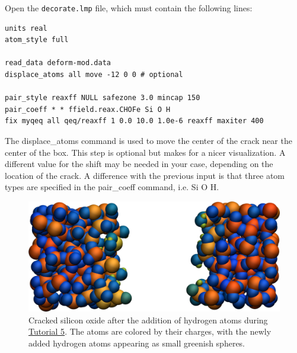 \documentclass[9pt,tutorial]{livecoms}
\newcommand{\lmpcmd}[1]{\colorbox{listing}{\textcolor{command}{\small{#1}}}} %
\newcommand{\flecmd}[1]{\textcolor{command}{\texttt{#1}}} %
\begin{document}
Open the \flecmd{decorate.lmp} file, which must contain the following lines:
\begin{lstlisting}
units real
atom_style full

read_data deform-mod.data
displace_atoms all move -12 0 0 # optional

pair_style reaxff NULL safezone 3.0 mincap 150
pair_coeff * * ffield.reax.CHOFe Si O H
fix myqeq all qeq/reaxff 1 0.0 10.0 1.0e-6 reaxff maxiter 400
\end{lstlisting}
The \lmpcmd{displace\_atoms} command is used to move the center of the
crack near the center of the box.  This step is optional but makes for a nicer
visualization.  A different value for the shift may be needed in
your case, depending on the location of the crack.  A difference with the previous
input is that three atom types are specified in the \lmpcmd{pair\_coeff} command, i.e.
\lmpcmd{Si O H}.

\begin{figure}
\includegraphics[width=\linewidth]{SIO-decorated}
\caption{Cracked silicon oxide after the addition of hydrogen atoms
during \hyperref[reactive-silicon-dioxide-label]{Tutorial 5}.  The atoms
are colored by their charges, with the newly added hydrogen atoms appearing as small
greenish spheres.}
\label{fig:SIO-decorated}
\end{figure}
\end{document}
